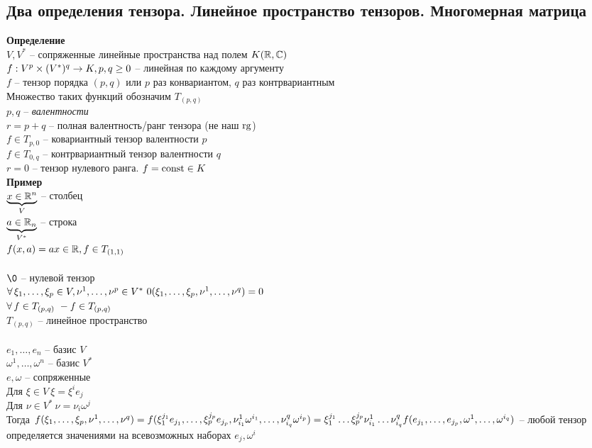 \documentclass[12pt]{article}
\begin{document}
\subsection{Два определения тензора. Линейное пространство тензоров. Многомерная матрица}
\textbf{Определение}\\
$V, V^*$ -- сопряженные линейные пространства над полем $K(\Rset, \Cset)$\\
$f: V^p\times (V^*)^q \rto K, p, q \geq 0$ -- линейная по каждому аргументу\\
$f$ -- тензор порядка $(p,q)$ или $p$ раз конвариантом, $q$ раз контрвариантным\\
Множество таких функций обозначим $T_{(p,q)}$\\
$p,q$ -- \textit{валентности}\\
$r = p+q$ -- полная валентность/ранг тензора (не наш $\rg$)\\
$f \in T_{p,0}$ -- ковариантный тензор валентности $p$\\
$f \in T_{0,q}$ -- контрвариантный тензор валентности $q$\\
$r = 0$ -- тензор нулевого ранга. $f = \const \in K$\\
\textbf{Пример}\\
$\ub{V}{x \in \Rset^n}$ -- столбец\\
$\ub{V^*}{a \in \Rset_n}$ -- строка\\
$f(x,a) = ax \in \Rset, f \in T_{(1,1)}$\\\\
$\0$ -- нулевой тензор\\
$\fall \xi_1, \ldots, \xi_p \in V, \nu^1, \ldots, \nu^p \in V^*\ 0(\xi_1, \ldots, \xi_p, \nu^1,\ldots,\nu^q) = 0$\\
$\fall f \in T_{(p,q)}\ -f \in T_{(p,q)}$\\
$T_{(p,q)}$ -- линейное пространство\\\\
$e_1, \ldots, e_n$ -- базис $V$\\
$\omega^1, \ldots, \omega^n$ -- базис $V^*$\\
$e, \omega$ -- сопряженные\\
Для $\xi \in V\ \xi = \xi^i e_j$\\
Для $\nu \in V^*\ \nu = \nu_i \omega^j$\\
Тогда $f(\xi_1, \ldots, \xi_p, \nu^1, \ldots, \nu^q) = f(\xi_1^{j_1} e_{j_1}, \ldots, \xi_p^{j_p}e_{j_p}, \nu^1_{i_1}\omega^{i_1}, \ldots, \nu^q_{i_q}\omega^{i_p})\\ = \xi_1^{j_1}\ldots\xi_p^{j_p}\nu^1_{i_1}\ldots\nu^q_{i_q}f(e_{j_1},\ldots,e_{j_p},\omega^1,\ldots,\omega^{i_q})$ -- любой тензор определяется значениями на всевозможных наборах $e_j, \omega^i$\\
\end{document}
